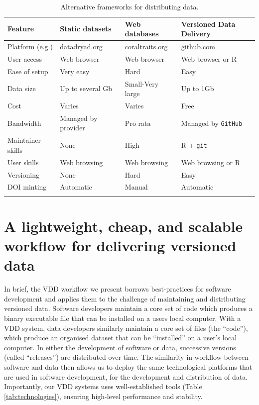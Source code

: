 \documentclass[a4paper,num-refs]{assets/oup-contemporary}
\begin{document}
\begin{table}[h!]
\centering
\caption{Alternative frameworks for distributing data.}
{
\vspace{0.2cm}
  \begin{tabular}{p{2.5cm}|p{3cm}p{3cm}p{4cm}}
  \hline
  \textbf{Feature} & \textbf{Static datasets}& \textbf{Web databases} & \textbf{Versioned Data Delivery}\\
  \hline
   Platform (e.g.) 	& datadryad.org 			& coraltraits.org	  &  github.com\\
   User access      & Web browser 				& Web browser 			& Web browser or R \\
   Ease of setup    & Very easy 					& Hard 							& Easy\\
   Data size        & Up to several Gb 		& Small-Very large 	& Up to 1Gb\\
   Cost             & Varies 							& Varies  					& Free \\
   Bandwidth        & Managed by provider & Pro rata 					& Managed by \texttt{GitHub}\\
   Maintainer skills & None 							& High							& R + \texttt{git} \\
   User skills      & Web browsing 	& Web browsing  					& Web browsing or R \\
   Versioning       & None 					& Hard 										& Easy \\
   DOI minting  &Automatic & Manual 									& Automatic \\
  \hline 
  \\
 
  \end{tabular}
  } 
\label{tab:publishing_models}
\end{table}

\section{A lightweight, cheap, and scalable workflow for delivering versioned data}

In brief, the VDD workflow we present borrows best-practices for software development \cite{Perez-Riverol-2016} and applies them to the challenge of maintaining and distributing versioned data. Software developers maintain a core set of code which produces a binary executable file that can be installed on a users local computer. With a VDD system, data developers similarly maintain a core set of files (the ``code''), which produce an organised dataset that can be ``installed'' on a user's local computer. In either the development of software or data, successive versions (called ``releases'') are distributed over time. The similarity in workflow between software and data then allows us to deploy the same technological platforms that are used in software development, for the development and distribution of data. Importantly, our VDD systems uses well-established tools (Table \ref{tab:technologies}), ensuring high-level performance and stability.
\end{document}
